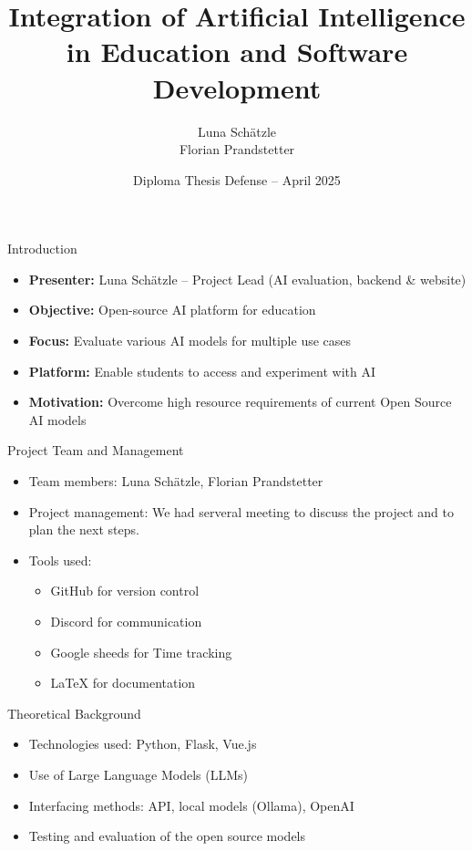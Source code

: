 \documentclass{beamer}
\title[AI Integration in Education and Dev]{Integration of Artificial Intelligence in Education and Software Development}
\author[Luna Sch\"atzle, Florian Prandstetter]{Luna Sch\"atzle \\ Florian Prandstetter}
\institute[HTL Anichstra\ss e]{HTL Anichstra\ss e, Department of Business Informatics}
\date{Diploma Thesis Defense -- April 2025}
\begin{document}
\begin{frame}
  \titlepage
\end{frame}

\begin{frame}{Introduction}
    \begin{itemize}
      \item \textbf{Presenter:} Luna Schätzle – Project Lead (AI evaluation, backend \& website)
      \item \textbf{Objective:} Open-source AI platform for education
      \item \textbf{Focus:} Evaluate various AI models for multiple use cases
      \item \textbf{Platform:} Enable students to access and experiment with AI
      \item \textbf{Motivation:} Overcome high resource requirements of current Open Source AI models
    \end{itemize}
  \end{frame}
  

\begin{frame}{Project Team and Management}
  \begin{itemize}
    \item Team members: Luna Schätzle, Florian Prandstetter
    \item Project management: We had serveral meeting to discuss the project and to plan the next steps.
    \item Tools used: 
      \begin{itemize}
        \item GitHub for version control
        \item Discord for communication
        \item Google sheeds for Time tracking
        \item LaTeX for documentation
      \end{itemize}
  \end{itemize}
\end{frame}

\begin{frame}{Theoretical Background}
  \begin{itemize}
    \item Technologies used: Python, Flask, Vue.js
    \item Use of Large Language Models (LLMs)
    \item Interfacing methods: API, local models (Ollama), OpenAI
    \item Testing and evaluation of the open source models
\end{itemize}
\end{frame}
\end{document}
